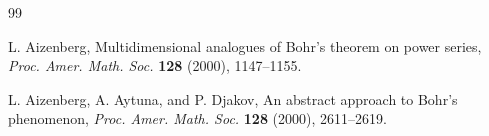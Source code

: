 \documentclass[a4paper,11pt, reqno]{amsart}
\theoremstyle{definition}
\begin{document}
\begin{thebibliography}{99}
	
	
	 {\sc L. Aizenberg}, Multidimensional analogues of Bohr's theorem on power series, \textit{Proc. Amer. Math. Soc.} {\bf 128} (2000), 1147--1155.
	
	 {\sc L. Aizenberg, A. Aytuna}, and {\sc P. Djakov}, An abstract approach to Bohr's phenomenon, {\it Proc. Amer. Math. Soc.} {\bf 128} (2000), 2611--2619.
	
	
	
	
	
	
	
	
	
	

\end{thebibliography}
\end{document}
